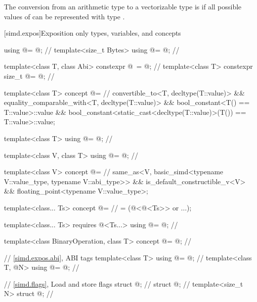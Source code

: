 \pnum
The conversion from an arithmetic type  to a vectorizable type  is
 if
all possible values of  can be represented with type .

[simd.expos]{Exposition only types, variables, and concepts}

\begin{codeblock}
using @\simdsizetype@ = @\seebelow@;                                 // \expos
template<size_t Bytes> using @\integerfrom@ = @\seebelow@;            // \expos

template<class T, class Abi>
  constexpr @\simdsizetype\ \simdsizev@ = @\seebelow@;               // \expos
template<class T> constexpr size_t @\maskelementsize@ = @\seebelow@; // \expos

template<class T>
  concept @\constexprwrapperlike@ =                                // \expos
    convertible_to<T, decltype(T::value)> &&
    equality_comparable_with<T, decltype(T::value)> &&
    bool_constant<T() == T::value>::value &&
    bool_constant<static_cast<decltype(T::value)>(T()) == T::value>::value;

template<class T> using @\deducedsimd@ = @\seebelow@;               // \expos

template<class V, class T> using @\makecompatiblesimdt@ = @\seebelow@; // \expos

template<class V>
  concept @\simdfloatingpoint@ =                                   // \expos
    same_as<V, basic_simd<typename V::value_type, typename V::abi_type>> &&
    is_default_constructible_v<V> && floating_point<typename V::value_type>;

template<class... Ts>
  concept @\mathfloatingpoint@ =                                   // \expos
    = (@\simdfloatingpoint@<@\deducedsimd@<Ts>> or ...);

template<class... Ts>
  requires @\mathfloatingpoint@<Ts...>
    using @\mathcommonsimd@ = @\seebelow@;                         // \expos

template<class BinaryOperation, class T>
  concept @\reductionoperation@ = @\seebelow@;                     // \expos

// \ref{simd.expos.abi},  ABI tags
template<class T> using @\nativeabi@ = @\seebelow@;                   // \expos
template<class T, @\simdsizetype@ N> using @\deducet@ = @\seebelow@;   // \expos

// \ref{simd.flags}, Load and store flags
struct @\convertflag@;                                              // \expos
struct @\alignedflag@;                                              // \expos
template<size_t N> struct @\overalignedflag@;                       // \expos
\end{codeblock}

